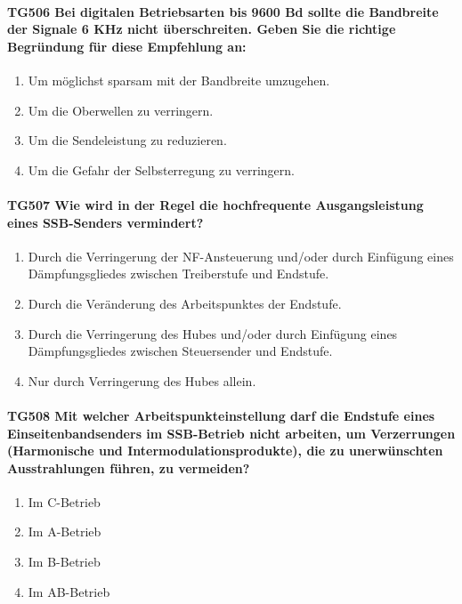 \documentclass[8pt]{article}
\begin{document}
\paragraph*{TG506 Bei digitalen Betriebsarten bis 9600 Bd sollte die Bandbreite der Signale 6 KHz nicht überschreiten. Geben Sie die richtige Begründung für diese Empfehlung an:}
\begin{enumerate}[nolistsep,label=\Alph*]
\item Um möglichst sparsam mit der Bandbreite umzugehen.
\item Um die Oberwellen zu verringern.
\item Um die Sendeleistung zu reduzieren.
\item Um die Gefahr der Selbsterregung zu verringern.
\end{enumerate}

\paragraph*{TG507 Wie wird in der Regel die hochfrequente Ausgangsleistung eines SSB-Senders vermindert?}
\begin{enumerate}[nolistsep,label=\Alph*]
\item Durch die Verringerung der NF-Ansteuerung und/oder durch Einfügung eines Dämpfungsgliedes zwischen Treiberstufe und Endstufe.
\item Durch die Veränderung des Arbeitspunktes der Endstufe.
\item Durch die Verringerung des Hubes und/oder durch Einfügung eines Dämpfungsgliedes zwischen Steuersender und Endstufe.
\item Nur durch Verringerung des Hubes allein. 
\end{enumerate}

\paragraph*{TG508 Mit welcher Arbeitspunkteinstellung darf die Endstufe eines Einseitenbandsenders im SSB-Betrieb nicht arbeiten, um Verzerrungen (Harmonische und Intermodulationsprodukte), die zu unerwünschten Ausstrahlungen führen, zu vermeiden?}
\begin{enumerate}[nolistsep,label=\Alph*]
\item Im C-Betrieb
\item Im A-Betrieb
\item Im B-Betrieb
\item Im AB-Betrieb
\end{enumerate}
\end{document}
